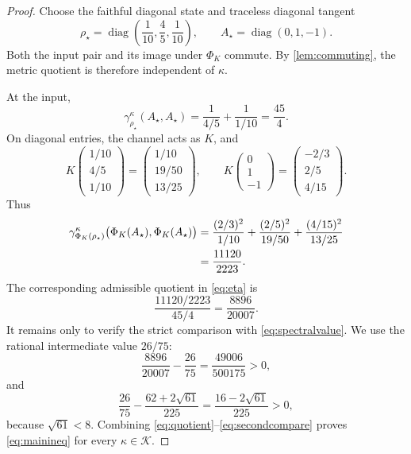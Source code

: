 \documentclass[11pt]{amsart}
\theoremstyle{definition}
\theoremstyle{remark}
\DeclareMathOperator{\diag}{diag}
\newcommand{\PhiK}{\Phi_K}
\begin{document}
\begin{proof}
Choose the faithful diagonal state and traceless diagonal tangent
\begin{equation}\label{eq:witness}
 \rho_\star
 =\diag\!\left(\frac1{10},\frac45,\frac1{10}\right),
 \qquad
 A_\star=\diag(0,1,-1).
\end{equation}
Both the input pair and its image under $\PhiK$ commute. By \cref{lem:commuting}, the metric quotient is therefore independent of $\kappa$.

At the input,
\begin{equation}\label{eq:inputmetric}
 \gamma_{\rho_\star}^\kappa(A_\star,A_\star)
 =\frac{1}{4/5}+\frac{1}{1/10}
 =\frac{45}{4}.
\end{equation}
On diagonal entries, the channel acts as $K$, and
\begin{equation}\label{eq:images}
 K
 \begin{pmatrix}1/10\\[1mm]4/5\\[1mm]1/10\end{pmatrix}
 =\begin{pmatrix}1/10\\[1mm]19/50\\[1mm]13/25\end{pmatrix},
 \qquad
 K
 \begin{pmatrix}0\\[1mm]1\\[1mm]-1\end{pmatrix}
 =\begin{pmatrix}-2/3\\[1mm]2/5\\[1mm]4/15\end{pmatrix}.
\end{equation}
Thus
\begin{align}
 \gamma_{\PhiK(\rho_\star)}^\kappa
 \bigl(\PhiK(A_\star),\PhiK(A_\star)\bigr)
 &=\frac{(2/3)^2}{1/10}
   +\frac{(2/5)^2}{19/50}
   +\frac{(4/15)^2}{13/25} \notag\\
 &=\frac{11120}{2223}.
 \label{eq:outputmetric}
\end{align}
The corresponding admissible quotient in \eqref{eq:eta} is
\begin{equation}\label{eq:quotient}
 \frac{11120/2223}{45/4}
 =\frac{8896}{20007}.
\end{equation}
It remains only to verify the strict comparison with \eqref{eq:spectralvalue}. We use the rational intermediate value $26/75$:
\begin{equation}\label{eq:firstcompare}
 \frac{8896}{20007}-\frac{26}{75}
 =\frac{49006}{500175}>0,
\end{equation}
and
\begin{equation}\label{eq:secondcompare}
 \frac{26}{75}-\frac{62+2\sqrt{61}}{225}
 =\frac{16-2\sqrt{61}}{225}>0,
\end{equation}
because $\sqrt{61}<8$. Combining \eqref{eq:quotient}--\eqref{eq:secondcompare} proves \eqref{eq:mainineq} for every $\kappa\in\mathcal K$.
\end{proof}
\end{document}
